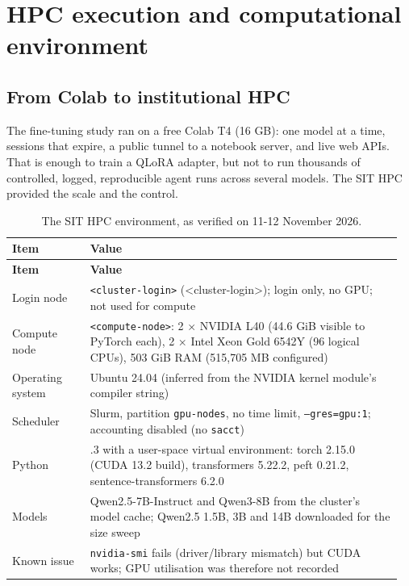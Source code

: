 \documentclass[10.5pt,a4paper,oneside]{report}
\begin{document}
\clearpage
\chapter{HPC execution and computational environment}
\section{From Colab to institutional HPC}
The fine-tuning study ran on a free Colab T4 (16 GB): one model at a time, sessions that expire, a public tunnel to a notebook server, and live web APIs. That is enough to train a QLoRA adapter, but not to run thousands of controlled, logged, reproducible agent runs across several models. The SIT HPC provided the scale and the control.

\begingroup\small\setlength{\tabcolsep}{4pt}\renewcommand{\arraystretch}{1.18}
\begin{longtable}{>{\raggedright\arraybackslash}p{0.191\linewidth}>{\raggedright\arraybackslash}p{0.769\linewidth}}
\caption{The SIT HPC environment, as verified on 11-12 November 2026.}\\
\toprule
\textbf{Item} & \textbf{Value} \\
\midrule
\endfirsthead
\toprule
\textbf{Item} & \textbf{Value} \\
\midrule
\endhead
\bottomrule
\endlastfoot
Login node & \texttt{<cluster-login>} (<cluster-login>); login only, no GPU; not used for compute \\
Compute node & \texttt{<compute-node>}: 2 × NVIDIA L40 (44.6 GiB visible to PyTorch each), 2 × Intel Xeon Gold 6542Y (96 logical CPUs), 503 GiB RAM (515,705 MB configured) \\
Operating system & Ubuntu 24.04 (inferred from the NVIDIA kernel module's compiler string) \\
Scheduler & Slurm, partition \texttt{gpu-nodes}, no time limit, \texttt{--gres=gpu:1}; accounting disabled (no \texttt{sacct}) \\
Python & 3.12.3 with a user-space virtual environment: torch 2.15.0 (CUDA 13.2 build), transformers 5.22.2, peft 0.21.2, sentence-transformers 6.2.0 \\
Models & Qwen2.5-7B-Instruct and Qwen3-8B from the cluster's model cache; Qwen2.5 1.5B, 3B and 14B downloaded for the size sweep \\
Known issue & \texttt{nvidia-smi} fails (driver/library mismatch) but CUDA works; GPU utilisation was therefore not recorded \\
\end{longtable}
\endgroup
\end{document}
